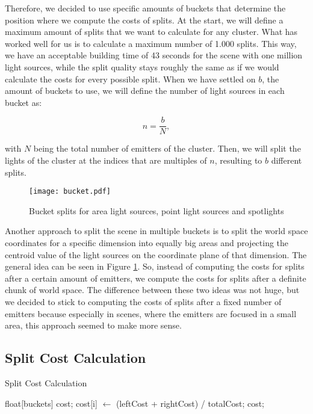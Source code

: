 Therefore, we decided to use specific amounts of buckets that determine the position where we compute the costs of splits. At the start, we will define a maximum amount of splits that we want to calculate for any cluster. What has worked well for us is to calculate a maximum number of 1.000 splits. This way, we have an acceptable building time of 43 seconds for the scene with one million light sources, while the split quality stays roughly the same as if we would calculate the costs for every possible split. When we have settled on $b$, the amount of buckets to use, we will define the number of light sources in each bucket as:

\begin{equation}
n = \frac{b}{N},
\end{equation}

with $N$ being the total number of emitters of the cluster. Then, we will split the lights of the cluster at the indices that are multiples of $n$, resulting to $b$ different splits. 

\begin{figure}
	\begin{center}
		\texttt{[image: bucket.pdf]}
		\caption{Bucket splits for area light sources, point light sources and spotlights}
		\label{fig:bucket}
	\end{center}
\end{figure}

Another approach to split the scene in multiple buckets is to split the world space coordinates for a specific dimension into equally big areas and projecting the centroid value of the light sources on the coordinate plane of that dimension. The general idea can be seen in Figure \ref{fig:bucket}. So, instead of computing the costs for splits after a certain amount of emitters, we compute the costs for splits after a definite chunk of world space. The difference between these two ideas was not huge, but we decided to stick to computing the costs of splits after a fixed number of emitters because especially in scenes, where the emitters are focused in a small area, this approach seemed to make more sense.

\subsection{Split Cost Calculation}
\label{subs:splitcost}

\begin{algorithm}
	\caption{Split Cost Calculation}
	\label{alg:splitcostcalculation}
	\begin{algorithmic}[1] %
		\State float[buckets] cost;
		\State <calculate axis, thetas, AABB and energy for the left part>
		\State <calculate axis, thetas, AABB and energy for the right part>
		\State <calculate leftCost, rightCost and totalCost>
		\State cost[i] $\gets$ (leftCost + rightCost) / totalCost;
		\EndFor
\State \Return cost;
\EndProcedure
\end{algorithmic}
\end{algorithm}

